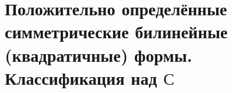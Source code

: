 \section{Положительно определённые симметрические билинейные (квадратичные) формы. Классификация над $С$}
